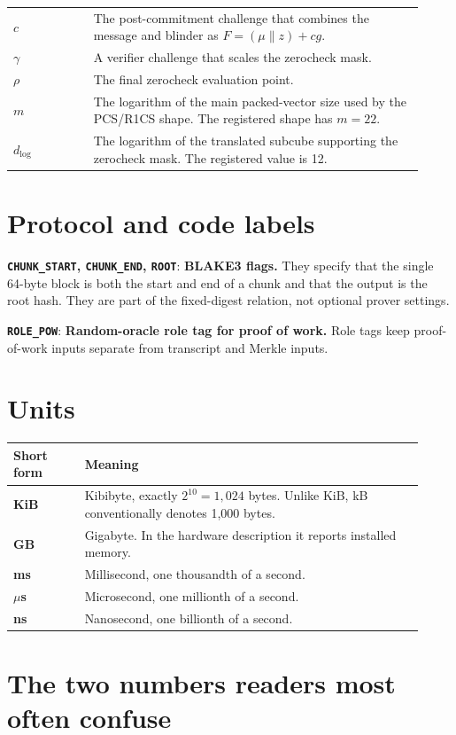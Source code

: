 \documentclass[11pt]{article}
\newcommand{\term}[2]{\textbf{#1}: \textbf{#2}}
\begin{document}
\begin{longtable}{@{}>{\raggedright\arraybackslash}p{0.18\linewidth}
                       >{\raggedright\arraybackslash}p{0.74\linewidth}@{}}
$c$ & The post-commitment challenge that combines the message and blinder as $F=(\mu\parallel z)+c g$. \\
$\gamma$ & A verifier challenge that scales the zerocheck mask. \\
$\rho$ & The final zerocheck evaluation point. \\
$m$ & The logarithm of the main packed-vector size used by the PCS/R1CS shape. The registered shape has $m=22$. \\
$d_{\log}$ & The logarithm of the translated subcube supporting the zerocheck mask. The registered value is 12. \\
\bottomrule
\end{longtable}

\section*{Protocol and code labels}

\term{\texttt{CHUNK\_START}, \texttt{CHUNK\_END}, \texttt{ROOT}}{BLAKE3 flags.}
They specify that the single 64-byte block is both the start and end of a
chunk and that the output is the root hash. They are part of the fixed-digest
relation, not optional prover settings.

\term{\texttt{ROLE\_POW}}{Random-oracle role tag for proof of work.}
Role tags keep proof-of-work inputs separate from transcript and Merkle inputs.

\section*{Units}

\begin{longtable}{@{}>{\bfseries}p{0.16\linewidth}p{0.76\linewidth}@{}}
\toprule
Short form & Meaning \\
\midrule
KiB & Kibibyte, exactly $2^{10}=1{,}024$ bytes. Unlike KiB, kB conventionally denotes 1,000 bytes. \\
GB & Gigabyte. In the hardware description it reports installed memory. \\
ms & Millisecond, one thousandth of a second. \\
$\mu$s & Microsecond, one millionth of a second. \\
ns & Nanosecond, one billionth of a second. \\
\bottomrule
\end{longtable}

\section*{The two numbers readers most often confuse}
\enlargethispage{2\baselineskip}
\end{document}
